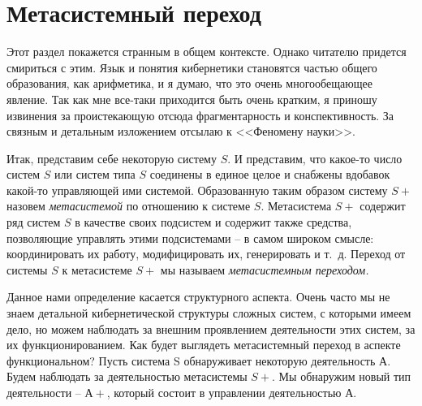 \documentclass{book}
\begin{document}
\section{Метасистемный переход}

Этот раздел покажется странным в общем контексте. Однако читателю придется смириться с этим. Язык и понятия кибернетики 
становятся частью общего образования, как арифметика, и я думаю, что это очень многообещающее явление. Так как мне все-таки 
приходится быть очень кратким, я приношу извинения за проистекающую отсюда фрагментарность и кон­спективность. За связным и 
детальным изложением отсылаю к <<Феномену науки>>.

Итак, представим себе некоторую систему $S$. И представим, что какое-то число систем $S$ или систем типа $S$ соединены в еди­ное 
целое и снабжены вдобавок какой-то управляющей ими системой. Образованную таким образом систему $S+$ назовем 
\textit{метасистемой} по отношению к системе $S$. Метасистема $S+$ содержит ряд систем $S$ в качестве своих подсистем и содержит 
также средства, позволяющие управлять  этими подсистемами -- в самом широком смысле: координировать их работу, модифицировать 
их, генерировать и т.~д. Переход от системы $S$ к метасистеме $S+$ мы называем \textit{метасистемным переходом.} 

Данное нами определение касается структурного аспекта. Очень часто мы не знаем детальной кибернетической структу­ры сложных 
систем, с которыми имеем дело, но можем наблю­дать за внешним проявлением деятельности этих систем, за их функционированием. Как 
будет выглядеть метасистемный переход в аспекте функциональном? Пусть система S обнару­живает некоторую деятельность $А$. Будем 
наблюдать за дея­тельностью метасистемы $S+$. Мы обнаружим новый тип дея­тельности -- $А+$, который состоит в управлении 
деятельно­стью $А$.
\end{document}
